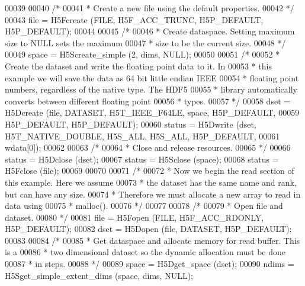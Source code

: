 \begin{DoxyCode}
00039 
00040     \textcolor{comment}{/*}
00041 \textcolor{comment}{     * Create a new file using the default properties.}
00042 \textcolor{comment}{     */}
00043     file = H5Fcreate (FILE, H5F\_ACC\_TRUNC, H5P\_DEFAULT, H5P\_DEFAULT);
00044 
00045     \textcolor{comment}{/*}
00046 \textcolor{comment}{     * Create dataspace.  Setting maximum size to NULL sets the maximum}
00047 \textcolor{comment}{     * size to be the current size.}
00048 \textcolor{comment}{     */}
00049     space = H5Screate\_simple (2, dims, NULL);
00050 
00051     \textcolor{comment}{/*}
00052 \textcolor{comment}{     * Create the dataset and write the floating point data to it.  In}
00053 \textcolor{comment}{     * this example we will save the data as 64 bit little endian IEEE}
00054 \textcolor{comment}{     * floating point numbers, regardless of the native type.  The HDF5}
00055 \textcolor{comment}{     * library automatically converts between different floating point}
00056 \textcolor{comment}{     * types.}
00057 \textcolor{comment}{     */}
00058     dset = H5Dcreate (file, DATASET, H5T\_IEEE\_F64LE, space, H5P\_DEFAULT,
00059                 H5P\_DEFAULT, H5P\_DEFAULT);
00060     status = H5Dwrite (dset, H5T\_NATIVE\_DOUBLE, H5S\_ALL, H5S\_ALL, H5P\_DEFAULT,
00061                 wdata[0]);
00062 
00063     \textcolor{comment}{/*}
00064 \textcolor{comment}{     * Close and release resources.}
00065 \textcolor{comment}{     */}
00066     status = H5Dclose (dset);
00067     status = H5Sclose (space);
00068     status = H5Fclose (file);
00069 
00070 
00071     \textcolor{comment}{/*}
00072 \textcolor{comment}{     * Now we begin the read section of this example.  Here we assume}
00073 \textcolor{comment}{     * the dataset has the same name and rank, but can have any size.}
00074 \textcolor{comment}{     * Therefore we must allocate a new array to read in data using}
00075 \textcolor{comment}{     * malloc().}
00076 \textcolor{comment}{     */}
00077 
00078     \textcolor{comment}{/*}
00079 \textcolor{comment}{     * Open file and dataset.}
00080 \textcolor{comment}{     */}
00081     file = H5Fopen (FILE, H5F\_ACC\_RDONLY, H5P\_DEFAULT);
00082     dset = H5Dopen (file, DATASET, H5P\_DEFAULT);
00083 
00084     \textcolor{comment}{/*}
00085 \textcolor{comment}{     * Get dataspace and allocate memory for read buffer.  This is a}
00086 \textcolor{comment}{     * two dimensional dataset so the dynamic allocation must be done}
00087 \textcolor{comment}{     * in steps.}
00088 \textcolor{comment}{     */}
00089     space = H5Dget\_space (dset);
00090     ndims = H5Sget\_simple\_extent\_dims (space, dims, NULL);

\end{DoxyCode}

